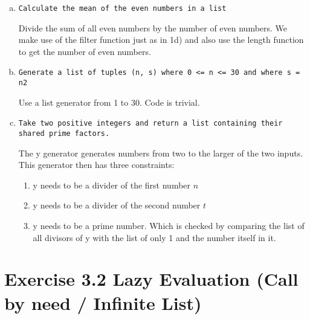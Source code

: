 \documentclass{article} %
\newcommand{\homeworkNumber}{3} %
\begin{document}
\begin{enumerate}[a)]
\item \verb|Calculate the mean of the even numbers in a list|\\
\lstset{language=Haskell}


Divide the sum of all even numbers by the number of even numbers. We make use of the filter function just as in 1d) and also use the length function to get the number of even numbers. \\

\item \verb|Generate a list of tuples (n, s) where 0 <= n <= 30 and where s = n2|\\
\lstset{language=Haskell}


Use a list generator from 1 to 30. Code is trivial. \\

\item \verb|Take two positive integers and return a list containing their shared prime factors.|\\
\lstset{language=Haskell}


The y generator generates numbers from two to the larger of the two inputs. This generator then has three constraints:
\begin{enumerate}[-]
\item y needs to be a divider of the first number $n$
\item y needs to be a divider of the second number $t$
\item y needs to be a prime number. Which is checked by comparing the list of all divisors of y with the list of only 1 and the number itself in it. \\
\end{enumerate}



\end{enumerate}
\clearpage


\section*{Exercise \homeworkNumber.2 Lazy Evaluation (Call by need / Infinite List)}
\end{document}
